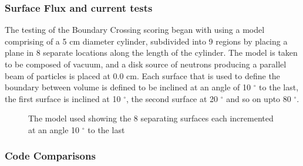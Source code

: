 \documentclass{anstrans}
\begin{document}
\subsubsection*{Surface Flux and current tests}
The testing of the Boundary Crossing scoring began with using a model comprising of a 5 cm diameter cylinder, subdivided into 9 regions by placing a plane in 8 separate locations along the length of the cylinder. The model is taken to be composed of vacuum, and a disk source of neutrons producing a parallel beam of particles is placed at 0.0 cm. Each surface that is used to define the boundary between volume is defined to be inclined at an angle of 10 $^{\circ}$ to the last, the first surface is inclined at 10 $^{\circ}$, the second surface at 20 $^{\circ}$ and so on upto 80 $^{\circ}$.

\begin{figure}[h!]
	\begin{center}
		\caption{The model used showing the 8 separating surfaces each
		incremented at an angle 10 $^{\circ}$ to the last}
	\end{center}
\end{figure}

\subsubsection{Code Comparisons}
\end{document}
